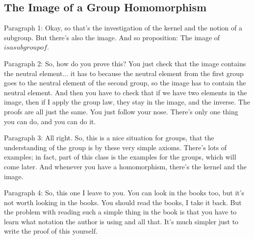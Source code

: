 \documentclass{article}
\begin{document}
\vspace*{14cm}
\subsection{The Image of a Group Homomorphism}
\begin{speech}[00:26:50 - 00:28:30]
Paragraph 1: Okay, so that's the investigation of the kernel and the notion of a subgroup. But there's also the image. And so proposition: The image of $ is a subgroup of $.

Paragraph 2: So, how do you prove this? You just check that the image contains the neutral element... it has to because the neutral element from the first group goes to the neutral element of the second group, so the image has to contain the neutral element. And then you have to check that if we have two elements in the image, then if I apply the group law, they stay in the image, and the inverse. The proofs are all just the same. You just follow your nose. There's only one thing you can do, and you can do it.

Paragraph 3: All right. So, this is a nice situation for groups, that the understanding of the group is by these very simple axioms. There's lots of examples; in fact, part of this class is the examples for the groups, which will come later. And whenever you have a homomorphism, there's the kernel and the image.

Paragraph 4: So, this one I leave to you. You can look in the books too, but it's not worth looking in the books. You should read the books, I take it back. But the problem with reading such a simple thing in the book is that you have to learn what notation the author is using and all that. It's much simpler just to write the proof of this yourself.
\end{speech}
\end{document}
